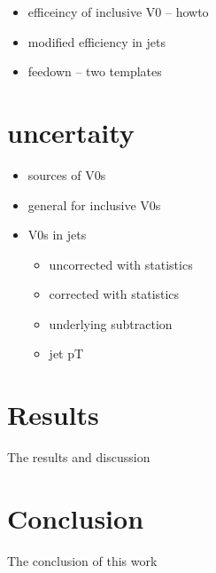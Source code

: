 \begin{itemize}
\item efficeincy of inclusive V0 -- howto
\item modified efficiency in jets
\item feedown -- two templates
\end{itemize}

\section{uncertaity}

\begin{itemize}
\item sources of V0s
\item general for inclusive V0s
\item V0s in jets
  \begin{itemize}
  \item uncorrected with statistics
  \item corrected with statistics
  \item underlying subtraction
  \item jet pT
  \end{itemize}
\end{itemize}

\section{Results}

The results and discussion

\section{Conclusion}

The conclusion of this work
